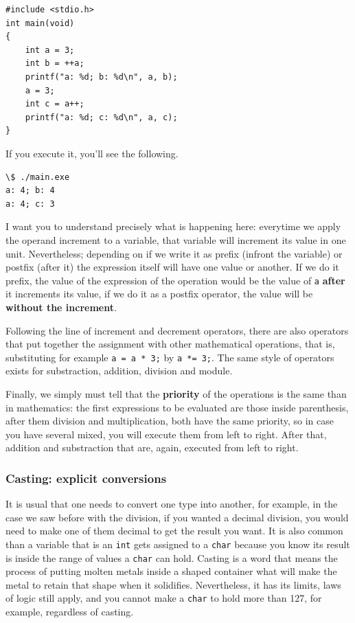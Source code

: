 \documentclass[a4paper]{article}
\begin{document}
\noindent
\begin{minipage}[H]{\linewidth}
\mbox{}
\begin{lstlisting}[style=C, caption={Increment and decrement operators},
label={lst:prefixAndPostfixOperators}]
#include <stdio.h>
int main(void)
{
    int a = 3;
    int b = ++a;
    printf("a: %d; b: %d\n", a, b);
    a = 3;
    int c = a++;
    printf("a: %d; c: %d\n", a, c);
}
\end{lstlisting}
\end{minipage}

If you execute it, you'll see the following.

\noindent
\begin{minipage}[H]{\linewidth}
\mbox{}
\begin{lstlisting}[style=terminalStyle]
\$ ./main.exe
a: 4; b: 4
a: 4; c: 3
\end{lstlisting}
\end{minipage}

I want you to understand precisely what is happening here: everytime we apply
the operand increment to a variable, that variable will increment
its value in one unit. Nevertheless; depending on if we write it as prefix
(infront the variable) or postfix (after it) the expression itself will have one
value or another. If we do it prefix, the value
of the expression of the operation
would be the value of \verb!a! \textbf{after} it increments its value, if we
do it as a postfix operator, the value will be \textbf{without the increment}.

Following the line of increment and decrement operators, there are also
operators that put together the assignment with other mathematical operations,
that is, substituting for example \lstinline[style=C]!a = a * 3;! by
\lstinline[style=C]!a *= 3;!. The same style of operators exists for
substraction, addition, division and module.

Finally, we simply must tell that the \textbf{priority} of the operations
is the same than in mathematics: the first expressions to be evaluated are those
inside parenthesis, after them division and multiplication, both have
the same priority, so in case you have several mixed, you will execute them
from left to right. After that, addition and substraction that are, again,
executed from left to right.

\subsubsection{Casting: explicit conversions}
It is usual that one needs to convert one type into another, for example, in the
case we saw before with the division, if you wanted a decimal division, you
would need to make one of them decimal to get the result you want. It is also
common than a variable that is an \texttt{int} gets assigned to a \texttt{char}
because you know its result is inside the range of values a \texttt{char} can
hold. Casting is a word that means the process of putting molten metals inside
a shaped container what will make the metal to retain that shape when it
solidifies. Nevertheless, it has its limits, laws of logic still apply, and you
cannot make a \texttt{char} to hold more than 127, for example, regardless of
casting.
\end{document}
